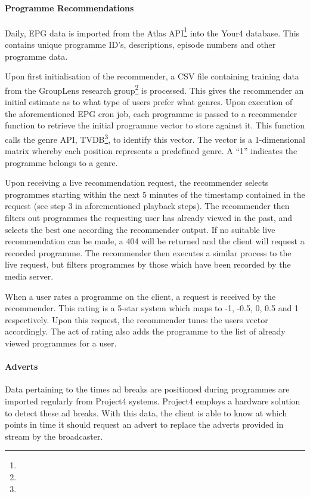 \paragraph{Programme Recommendations}

Daily, EPG data is imported from the Atlas API\footnote{} into the Your4 database. This contains unique programme ID's, descriptions, episode numbers and other programme data.

Upon first initialisation of the recommender, a CSV file containing training data from the GroupLens research group\footnote{} is processed. This gives the recommender an initial estimate as to what type of users prefer what genres. Upon execution of the aforementioned EPG cron job, each programme is passed to a recommender function to retrieve the initial programme vector to store against it. This function calls the genre API, TVDB\footnote{}, to identify this vector. The vector is a 1-dimensional matrix whereby each position represents a predefined genre. A ``1'' indicates the programme belongs to a genre.

Upon receiving a live recommendation request, the recommender selects programmes starting within the next 5 minutes of the timestamp contained in the request (see step 3 in aforementioned playback steps). The recommender then filters out programmes the requesting user has already viewed in the past, and selects the best one according the recommender output. If no suitable live recommendation can be made, a 404 will be returned and the client will request a recorded programme. The recommender then executes a similar process to the live request, but filters programmes by those which have been recorded by the media server.

When a user rates a programme on the client, a request is received by the recommender. This rating is a 5-star system which maps to -1, -0.5, 0, 0.5 and 1 respectively. Upon this request, the recommender tunes the users vector accordingly. The act of rating also adds the programme to the list of already viewed programmes for a user.

\paragraph{Adverts}

Data pertaining to the times ad breaks are positioned during programmes are imported regularly from Project4 systems. Project4 employs a hardware solution to detect these ad breaks. With this data, the client is able to know at which points in time it should request an advert to replace the adverts provided in stream by the broadcaster.





